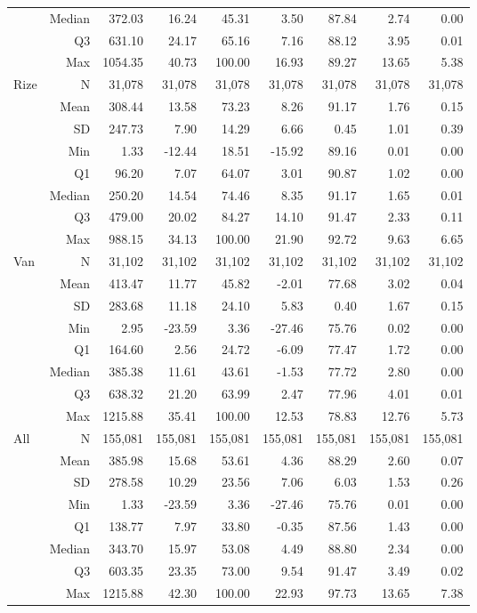 \begin{table}[htbp]
\begin{tabular}{lrrrrrrrr}
 & Median & 372.03 & 16.24 & 45.31 & 3.50 & 87.84 & 2.74 & 0.00 \\
 & Q3 & 631.10 & 24.17 & 65.16 & 7.16 & 88.12 & 3.95 & 0.01 \\
 & Max & 1054.35 & 40.73 & 100.00 & 16.93 & 89.27 & 13.65 & 5.38 \\
Rize & N & 31,078 & 31,078 & 31,078 & 31,078 & 31,078 & 31,078 & 31,078 \\
 & Mean & 308.44 & 13.58 & 73.23 & 8.26 & 91.17 & 1.76 & 0.15 \\
 & SD & 247.73 & 7.90 & 14.29 & 6.66 & 0.45 & 1.01 & 0.39 \\
 & Min & 1.33 & -12.44 & 18.51 & -15.92 & 89.16 & 0.01 & 0.00 \\
 & Q1 & 96.20 & 7.07 & 64.07 & 3.01 & 90.87 & 1.02 & 0.00 \\
 & Median & 250.20 & 14.54 & 74.46 & 8.35 & 91.17 & 1.65 & 0.01 \\
 & Q3 & 479.00 & 20.02 & 84.27 & 14.10 & 91.47 & 2.33 & 0.11 \\
 & Max & 988.15 & 34.13 & 100.00 & 21.90 & 92.72 & 9.63 & 6.65 \\
Van & N & 31,102 & 31,102 & 31,102 & 31,102 & 31,102 & 31,102 & 31,102 \\
 & Mean & 413.47 & 11.77 & 45.82 & -2.01 & 77.68 & 3.02 & 0.04 \\
 & SD & 283.68 & 11.18 & 24.10 & 5.83 & 0.40 & 1.67 & 0.15 \\
 & Min & 2.95 & -23.59 & 3.36 & -27.46 & 75.76 & 0.02 & 0.00 \\
 & Q1 & 164.60 & 2.56 & 24.72 & -6.09 & 77.47 & 1.72 & 0.00 \\
 & Median & 385.38 & 11.61 & 43.61 & -1.53 & 77.72 & 2.80 & 0.00 \\
 & Q3 & 638.32 & 21.20 & 63.99 & 2.47 & 77.96 & 4.01 & 0.01 \\
 & Max & 1215.88 & 35.41 & 100.00 & 12.53 & 78.83 & 12.76 & 5.73 \\
All & N & 155,081 & 155,081 & 155,081 & 155,081 & 155,081 & 155,081 & 155,081 \\
 & Mean & 385.98 & 15.68 & 53.61 & 4.36 & 88.29 & 2.60 & 0.07 \\
 & SD & 278.58 & 10.29 & 23.56 & 7.06 & 6.03 & 1.53 & 0.26 \\
 & Min & 1.33 & -23.59 & 3.36 & -27.46 & 75.76 & 0.01 & 0.00 \\
 & Q1 & 138.77 & 7.97 & 33.80 & -0.35 & 87.56 & 1.43 & 0.00 \\
 & Median & 343.70 & 15.97 & 53.08 & 4.49 & 88.80 & 2.34 & 0.00 \\
 & Q3 & 603.35 & 23.35 & 73.00 & 9.54 & 91.47 & 3.49 & 0.02 \\
 & Max & 1215.88 & 42.30 & 100.00 & 22.93 & 97.73 & 13.65 & 7.38 \\
\hline
\end{tabular}
\end{table}
